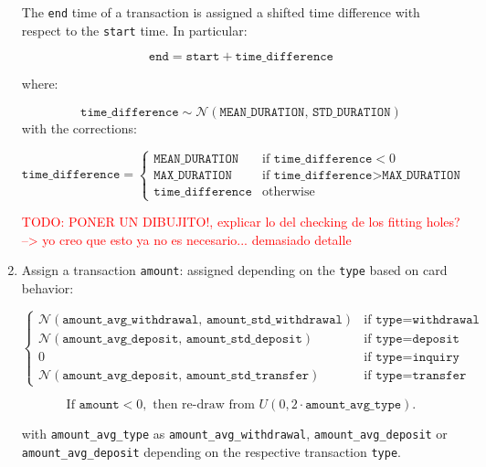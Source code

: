 \documentclass{article}
\begin{document}
\begin{enumerate}
    The \texttt{end} time of a transaction is assigned a shifted time difference with respect to the \texttt{start} time. In particular:

    $$
    \texttt{end} = \texttt{start} + \texttt{time\_difference}
    $$

    where:

    $$\texttt{time\_difference} \sim \mathcal{N}(\texttt{MEAN\_DURATION},\,\texttt{STD\_DURATION})$$ with the corrections:

    $$
    \texttt{time\_difference} =
    \begin{cases} 
        \texttt{MEAN\_DURATION} & \text{if } \texttt{time\_difference} < 0 \\
        \texttt{MAX\_DURATION} & \text{if } \texttt{time\_difference} > \texttt{MAX\_DURATION} \\
        \texttt{time\_difference} & \text{otherwise}
    \end{cases}
    $$

\textcolor{red}{TODO: PONER UN DIBUJITO!, explicar lo del checking de los fitting holes? --> yo creo que esto ya no es necesario... demasiado detalle}


  \item Assign a transaction \texttt{amount}: assigned depending on the \texttt{type} based on card behavior:
    
  $$
  \begin{cases}
    \mathcal{N}(\texttt{amount\_avg\_withdrawal},\, \texttt{amount\_std\_withdrawal}) & \text{if } \texttt{type} = \texttt{withdrawal} \\[10pt]
    
    \mathcal{N}(\texttt{amount\_avg\_deposit},\, \texttt{amount\_std\_deposit}) & \text{if } \texttt{type} = \texttt{deposit} \\[10pt]

    0 & \text{if } \texttt{type} = \texttt{inquiry} \\[10pt]
    
    \mathcal{N}(\texttt{amount\_avg\_deposit},\, \texttt{amount\_std\_transfer}) & \text{if } \texttt{type} = \texttt{transfer}
  \end{cases}
  $$

  $$
  \text{If } \texttt{amount} < 0, \text{ then re-draw from } U(0, 2 \cdot \texttt{amount\_avg\_type}).
  $$

  with \texttt{amount\_avg\_type} as \texttt{amount\_avg\_withdrawal}, \texttt{amount\_avg\_deposit} or \texttt{amount\_avg\_deposit} depending on the respective transaction \texttt{type}.

\end{enumerate}
\end{document}
